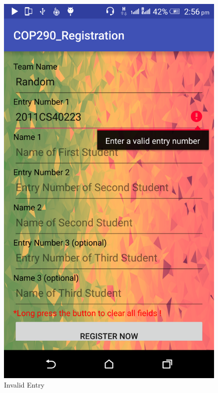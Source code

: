 \documentclass[12pt]{article}
\begin{document}
\begin{figure}[!htb]
  \centering
  \begin{minipage}[b]{0.4\textwidth}
    \includegraphics[width=\textwidth]{images/invalidentry.png}
    \caption{Invalid Entry}
  \end{minipage}
  \hfill
  \begin{minipage}[b]{0.4\textwidth}

\end{minipage}
\end{figure}
\end{document}
